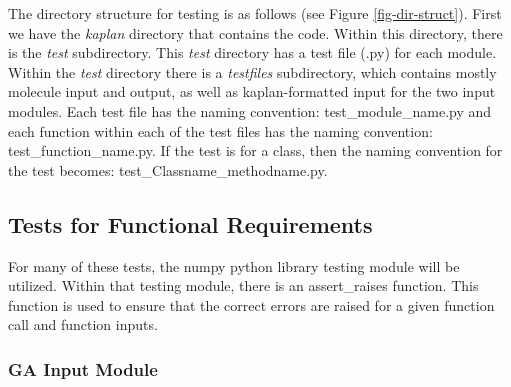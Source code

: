 \documentclass[12pt, titlepage]{article}
\begin{document}
The directory structure for testing is as follows (see Figure 
\ref{fig-dir-struct}). First we have the \textit{kaplan} directory that 
contains the code. Within this directory, there is the \textit{test} 
subdirectory. This \textit{test} directory has a test file (.py) for each 
module. Within the \textit{test} directory there is a \textit{testfiles} 
subdirectory, which contains mostly molecule input and output, as well as 
kaplan-formatted input for the two input modules. Each test file has the naming 
convention: test\_module\_name.py and each function within each of the test 
files has the naming convention: test\_function\_name.py. If the test is for a 
class, then the naming convention for the test becomes: 
test\_Classname\_methodname.py.



\subsection{Tests for Functional Requirements}

For many of these tests, the numpy python library testing module will be 
utilized. Within that testing module, there is an assert\_raises function. This 
function is used to ensure that the correct errors are raised for a given 
function call and function inputs.


\subsubsection{GA Input Module} \label{test-ga_input}

\end{document}
